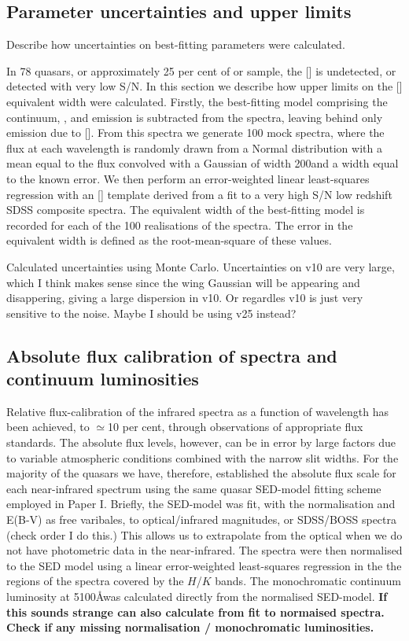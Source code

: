 \subsection{Parameter uncertainties and upper limits}

Describe how uncertainties on best-fitting parameters were calculated. 

In 78 quasars, or approximately 25 per cent of or sample, the [] is undetected, or detected with very low S/N. 
In this section we describe how upper limits on the [] equivalent width were calculated. 
Firstly, the best-fitting model comprising the continuum, , and \hb emission is subtracted from the spectra, leaving behind only emission due to []. 
From this spectra we generate 100 mock spectra, where the flux at each wavelength is randomly drawn from a Normal distribution with a mean equal to the flux convolved with a Gaussian of width 200\kms and a width equal to the known error. 
We then perform an error-weighted linear least-squares regression with an [] template derived from a fit to a very high S/N low redshift SDSS composite spectra. 
The equivalent width of the best-fitting model is recorded for each of the 100 realisations of the spectra. 
The error in the equivalent width is defined as the root-mean-square of these values.

Calculated uncertainties using Monte Carlo. 
Uncertainties on v10 are very large, which I think makes sense since the wing Gaussian will be appearing and disappering, giving a large dispersion in v10. Or regardles v10 is just very sensitive to the noise. 
Maybe I should be using v25 instead? 

\subsection{Absolute flux calibration of spectra and continuum luminosities}

Relative flux-calibration of the infrared spectra as a function of wavelength has been achieved, to $\simeq$10 per cent, through observations of appropriate flux standards. 
The absolute flux levels, however, can be in error by large factors due to variable atmospheric conditions combined with the narrow slit widths. 
For the majority of the quasars we have, therefore, established the absolute flux scale for each near-infrared spectrum using the same quasar SED-model fitting scheme employed in Paper I.
Briefly, the SED-model was fit, with the normalisation and E(B-V) as free varibales, to optical/infrared magnitudes, or SDSS/BOSS spectra (check order I do this.)
This allows us to extrapolate from the optical when we do not have photometric data in the near-infrared. 
The spectra were then normalised to the SED model using a linear error-weighted least-squares regression in the the regions of the spectra covered by the $H$/$K$ bands. 
The monochromatic continuum luminosity at 5100\AA was calculated directly from the normalised SED-model. 
{\bf If this sounds strange can also calculate from fit to normaised spectra.}
{\bf Check if any missing normalisation / monochromatic luminosities.} 


